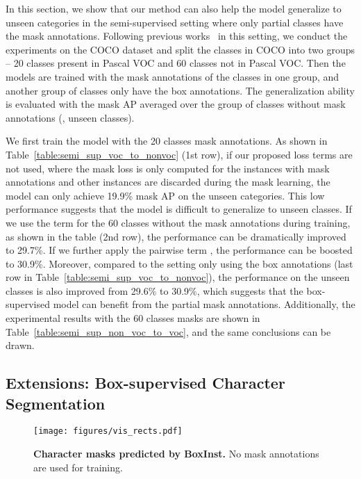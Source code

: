 \documentclass[final]{cvpr}
\newcommand{\1}{{\mathbbm{1}}}
\def\Ours{{BoxInst}\xspace}
\begin{document}
{\begin{table}[t!]
\end{table}

In this section, we show that our method can also help the model generalize to unseen categories in the semi-supervised setting where only partial classes have the mask annotations. Following previous works~\cite{Zhou2020ShapeProp, hu2018learning, kuo2019shapemask} in this setting, we conduct the experiments on the COCO dataset and split the  classes in COCO into two groups -- 20 classes present in Pascal VOC and 60 classes not in Pascal VOC. Then the models are trained with the mask annotations of the classes in one group, and another group of classes only have the box annotations. The generalization ability is evaluated with the mask AP averaged over the group of classes without mask annotations (\ie, unseen classes).

We first train the model with the 20 classes mask annotations. As shown in Table~\ref{table:semi_sup_voc_to_nonvoc} (1st row), if our proposed loss terms are not used, where the mask loss is only computed for the instances with mask annotations and other instances are discarded during the mask learning, the model can only achieve 19.9\% mask AP on the unseen categories. This low performance suggests that the model is difficult to generalize to unseen classes. If we use the  term for the 60 classes without the mask annotations during training, as shown in the table (2nd row), the performance can be dramatically improved to 29.7\%. If we further apply the pairwise term , the performance can be boosted to 30.9\%. Moreover, compared to the setting only using the box annotations (last row in Table~\ref{table:semi_sup_voc_to_nonvoc}), the performance on the unseen classes is also improved from 29.6\% to 30.9\%, which suggests that the box-supervised model can benefit from the partial mask annotations. Additionally, the experimental results with the 60 classes masks are shown in Table~\ref{table:semi_sup_non_voc_to_voc}, and the same conclusions can be drawn.

\subsection{Extensions: Box-supervised Character Segmentation} \label{SEC:CHAR}


\begin{figure}[t!]
\centering
\texttt{[image: figures/vis\_rects.pdf]}
\caption{\textbf{Character masks predicted
   by \Ours.} No
   mask annotations are used for
   training.}
\label{fig:char_segmentation}


\end{figure}}
\end{document}
